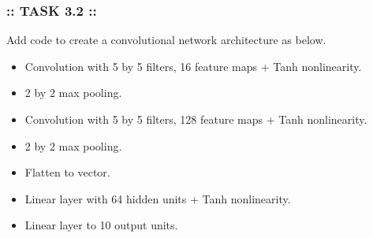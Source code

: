 \documentclass[11pt]{article}
\providecommand{\tightlist}{%
      \setlength{\itemsep}{0pt}\setlength{\parskip}{0pt}}
\begin{document}
    \hypertarget{task-3.2}{%
\subsubsection{:: TASK 3.2 ::}\label{task-3.2}}

Add code to create a convolutional network architecture as below.

\begin{itemize}
\tightlist
\item
  Convolution with 5 by 5 filters, 16 feature maps + Tanh nonlinearity.
\item
  2 by 2 max pooling.
\item
  Convolution with 5 by 5 filters, 128 feature maps + Tanh nonlinearity.
\item
  2 by 2 max pooling.
\item
  Flatten to vector.
\item
  Linear layer with 64 hidden units + Tanh nonlinearity.
\item
  Linear layer to 10 output units.
\end{itemize}
\end{document}
